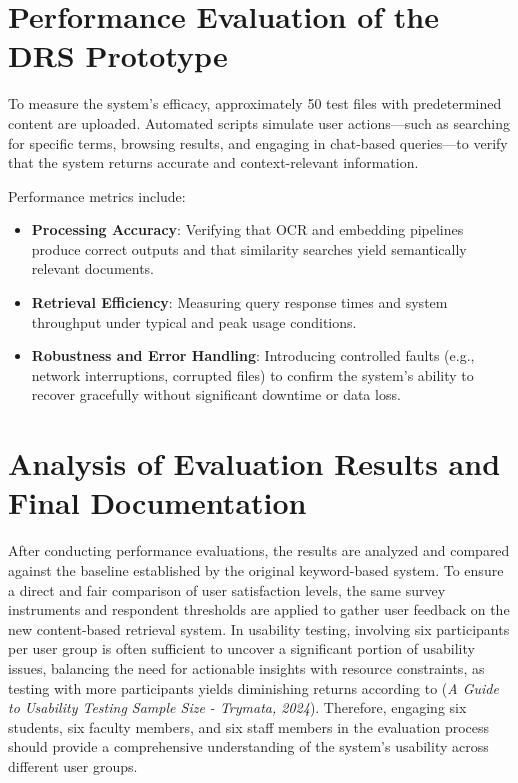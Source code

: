 \section{Performance Evaluation of the DRS Prototype}

\noindent To measure the system’s efficacy, approximately 50 test files with predetermined content are uploaded. Automated scripts simulate user actions—such as searching for specific terms, browsing results, and engaging in chat-based queries—to verify that the system returns accurate and context-relevant information.

\noindent Performance metrics include:

\begin{itemize}
    \item \textbf{Processing Accuracy}: Verifying that OCR and embedding pipelines produce correct outputs and that similarity searches yield semantically relevant documents.
    
    \item \textbf{Retrieval Efficiency}: Measuring query response times and system throughput under typical and peak usage conditions.
    
    \item \textbf{Robustness and Error Handling}: Introducing controlled faults (e.g., network interruptions, corrupted files) to confirm the system’s ability to recover gracefully without significant downtime or data loss.
\end{itemize}

\section{Analysis of Evaluation Results and Final Documentation}

\noindent After conducting performance evaluations, the results are analyzed and compared against the baseline established by the original keyword-based system. To ensure a direct and fair comparison of user satisfaction levels, the same survey instruments and respondent thresholds are applied to gather user feedback on the new content-based retrieval system. In usability testing, involving six participants per user group is often sufficient to uncover a significant portion of usability issues, balancing the need for actionable insights with resource constraints, as testing with more participants yields diminishing returns according to (\textit{A Guide to Usability Testing Sample Size - Trymata, 2024}).  Therefore, engaging six students, six faculty members, and six staff members in the evaluation process should provide a comprehensive understanding of the system's usability across different user groups.

